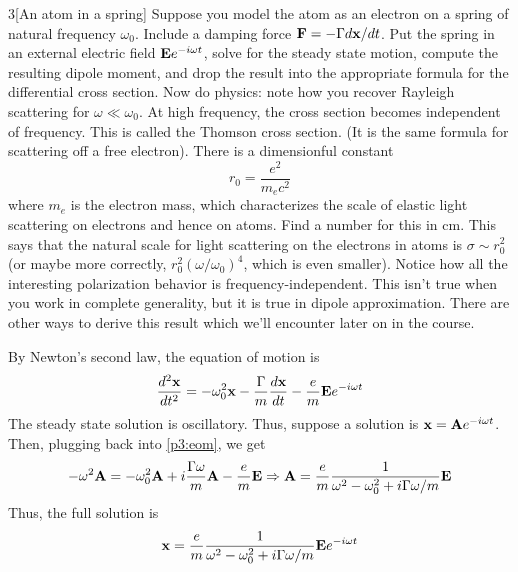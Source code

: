 \documentclass[12pt]{article}
\begin{document}
\newpage
\begin{problem}{3}[An atom in a spring]
Suppose you model the atom as an electron on a spring of natural frequency
$\omega_0$. Include a damping force $\vb{F}=-\Gamma d\vb{x}/dt$. Put the spring
in an external electric field $\vb{E}e^{-i\omega t}$, solve for the steady state
motion, compute the resulting dipole moment, and drop the result into the
appropriate formula for the differential cross section. Now do physics: note how
you recover Rayleigh scattering for $\omega\ll\omega_0$. At high frequency, the
cross section becomes independent of frequency. This is called the Thomson cross
section. (It is the same formula for scattering off a free electron). There is a
dimensionful constant
\begin{equation}
    r_0=\frac{e^2}{m_ec^2} 
\end{equation}
where $m_e$ is the electron mass, which characterizes the scale of elastic light
scattering on electrons and hence on atoms. Find a number for this in cm. This
says that the natural scale for light scattering on the electrons in atoms is
$\sigma\sim r_0^2$ (or maybe more correctly, $r_0^2(\omega/\omega_0)^4$, which
is even smaller). Notice how all the interesting polarization behavior is
frequency-independent. This isn't true when you work in complete generality, but
it is true in dipole approximation. There are other ways to derive this result
which we'll encounter later on in the course.
\begin{solution}
By Newton's second law, the equation of motion is
\begin{equation}\label{p3:eom}
    \frac{d^2\vb{x}}{dt^2}
    =-\omega_0^2\vb{x}-\frac{\Gamma}{m}\frac{d\vb{x}}{dt}
    -\frac{e}{m}\vb{E}e^{-i\omega t}
\end{equation}
The steady state solution is oscillatory. Thus, suppose a solution is
$\vb{x}=\vb{A}e^{-i\omega t}$. Then, plugging back into \eqref{p3:eom}, we get
\begin{equation}
    -\omega^2\vb{A}=-\omega_0^2\vb{A}+i\frac{\Gamma\omega}{m}\vb{A}-\frac{e}{m}\vb{E} 
    \Rightarrow\vb{A}=\frac{e}{m}\frac{1}{\omega^2-\omega_0^2+i\Gamma\omega/m}\vb{E}
\end{equation}
Thus, the full solution is
\begin{equation}
    \vb{x}=\frac{e}{m}\frac1{\omega^2-\omega_0^2+i\Gamma\omega/m}\vb{E}e^{-i\omega
    t} 

\end{equation}
\end{solution}
\end{problem}
\end{document}
